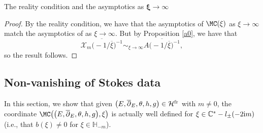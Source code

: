 \begin{subsubsection}{The reality condition and the asymptotics as $\boldsymbol{\xi \to \infty}$}
\begin{Corollary}
\end{Corollary}

\begin{proof}
By the reality condition, we have that the asymptotics of $\MC(\xi)$ as $\xi \to \infty$ match the asymptotics of  as $\xi \to \infty$. But by Proposition \ref{a0}, we have that
\begin{equation*}
\overline{\mathcal{X}_m\bigl(-1/\overline{\xi}\bigr)^{-1}}\sim_{\xi \to \infty} \overline{A\bigl(-1/\overline{\xi}\bigr)^{-1}},
\end{equation*}
so the result follows.
\end{proof}

\end{subsubsection}

\subsection{Non-vanishing of Stokes data}\label{nonvanishing}

In this section, we show that given $\bigl(E,\overline{\partial}_E,\theta,h,g\bigr) \in \mathcal{H}^{{\rm fr}}$ with $m\neq 0$, the coordinate $\MC\bigl(\bigl(E,\overline{\partial}_E,\allowbreak\theta, h,g\bigr),\xi\bigr)$ is actually well defined for $\xi \in \mathbb{C}^* -l_{\pm}(-2{\rm i}m)$ (i.e., that $b(\xi)\neq 0$ for $\xi \in \mathbb{H}_{-m}$).

